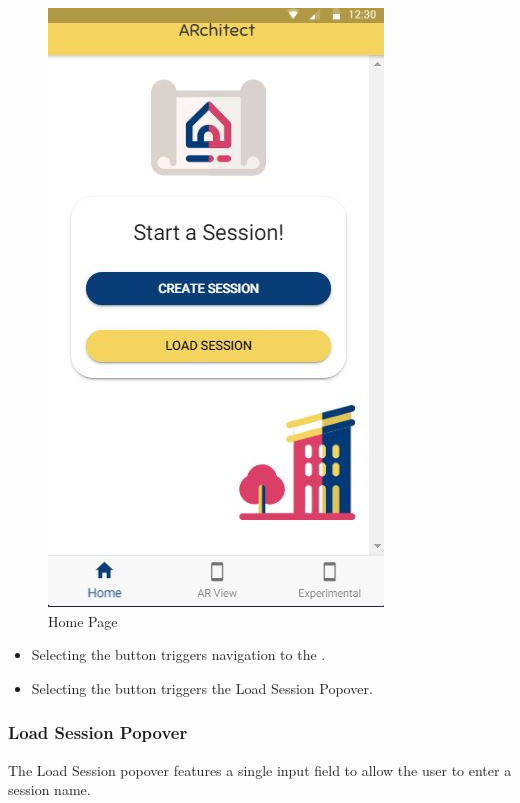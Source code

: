 \begin{figure}[ht!]
\caption{Home Page}
\centering
\includegraphics[scale=0.65]{images/home_page.JPG}
\end{figure}


\begin{itemize}
    \item Selecting the  button triggers navigation to the .
    
    \item Selecting the  button triggers the Load Session Popover. 

\end{itemize}



\subsubsection{Load Session Popover}
The Load Session popover features a single input field to allow the user to enter a session name. 


